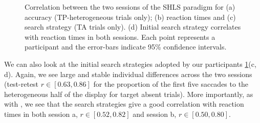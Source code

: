 \documentclass[a4paper, man, natbib, floatsintext]{apa6}
\begin{document}
\begin{figure}
\centering
{}
\caption{Correlation between the two sessions of the SHLS paradigm for (a)  accuracy (TP-heterogeneous trials only); (b) reaction times and (c) search strategy (TA trials only). (d) Initial search strategy correlates with reaction times in both sessions. Each point represents a participant and the error-bars indicate 95\% confidence intervals.}
\label{fig:splithalf_summary}
\end{figure}

We can also look at the initial search strategies adopted by our participants \ref{fig:splithalf_summary}(c, d). Again, we see large and stable individual differences across the two sessions (test-retest $r \in [0.63, 0.86]$ for the proportion of the first five saccades to the heterogeneous half of the display for target absent trials). More importantly, as with  \citep{nowakowska2017}, we see that the search strategies give a good correlation with reaction times in both session a, $r \in [0.52, 0.82]$ and session b, $r \in [0.50, 0.80]$.
\end{document}

